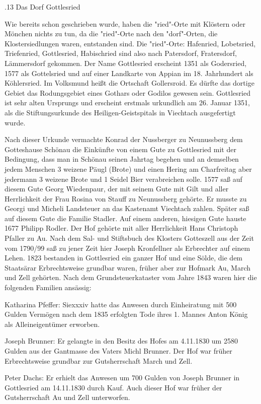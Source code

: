 .13 Das Dorf Gottlesried

Wie bereits schon geschrieben wurde, haben die "ried"-Orte mit Klöstern oder
Mönchen nichts zu tun, da die "ried"-Orte nach den "dorf"-Orten, die
Klostersiedlungen waren, entstanden sind. Die "ried"-Orte: Hafenried,
Lobetsried, Triefenried, Gottlesried, Habischried sind also nach Patersdorf,
Fratersdorf, Lämmersdorf gekommen. Der Name Gottlesried erscheint 1351 als
Godersried, 1577 als Gottelsried und auf einer Landkarte von Appian im 18.
Jahrhundert als Köhlersried. Im Volksmund heißt die Ortschaft Gollersroid. Es
dürfte das dortige Gebiet das Rodungsgebiet eines Gothars oder Godilos gewesen
sein. Gottlesried ist sehr alten Ursprungs und erscheint erstmals urkundlich am
26. Januar 1351, als die Stiftungsurkunde des Heiligen-Geistspitals in Viechtach
ausgefertigt wurde.

Nach dieser Urkunde vermachte Konrad der Nussberger zu Neunussberg dem
Gotteshause Schönau die Einkünfte von einem Gute zu Gottlesried mit der
Bedingung, dass man in Schönau seinen Jahrtag begehen und an demselben jedem
Menschen 3 weizene Päugl (Brote) und einen Hering am Charfreitag aber jedermann
3 weizene Brote und 1 Seidel Bier verabreichen solle. 1577 saß auf diesem Gute
Georg Wiedenpaur, der mit seinem Gute mit Gilt und aller Herrlichkeit der Frau
Rosina von Stauff zu Neunussberg gehörte. Er musste zu Georgi und Micheli
Landsteuer an das Kastenamt Viechtach zahlen. Später saß auf diesem Gute die
Familie Stadler. Auf einem anderen, hiesigen Gute hauste 1677 Philipp Rodler.
Der Hof gehörte mit aller Herrlichkeit Hans Christoph Pfaller zu Au. Nach dem
Sal- und Stiftsbuch des Klosters Gotteszell aus der Zeit vom 1790/99 saß zu
jener Zeit hier Joseph Kronfellner als Erbrechter auf einem Lehen. 1823
bestanden in Gottlesried ein ganzer Hof und eine Sölde, die dem Staatsärar
Erbrechtsweise grundbar waren, früher aber zur Hofmark Au, March und Zell
gehörten. Nach dem Grundsteuerkataster vom Jahre 1843 waren hier die folgenden
Familien ansässig:



Katharina Pfeffer: Siexxxiv hatte das Anwesen durch Einheiratung mit 500 Gulden
Vermögen nach dem 1835 erfolgten Tode ihres 1. Mannes Anton König als
Alleineigentümer erworben.

Joseph Brunner: Er gelangte in den Besitz des Hofes am 4.11.1830 um 2580 Gulden
aus der Gantmasse des Vaters Michl Brunner. Der Hof war früher Erbrechtsweise
grundbar zur Gutsherrschaft March und Zell.

Peter Dachs: Er erhielt das Anwesen um 700 Gulden von Joseph Brunner in
Gottlesried am 14.11.1830 durch Kauf. Auch dieser Hof war früher der
Gutsherrschaft Au und Zell unterworfen.

